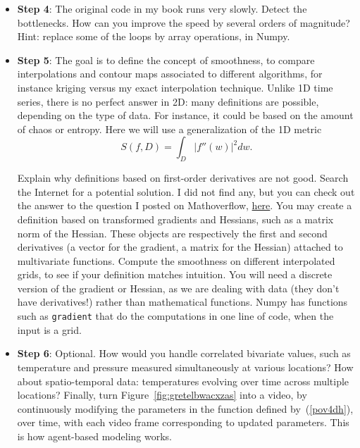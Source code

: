 \documentclass[oneside,10pt]{book}
\begin{document}
\begin{itemize}
\item[] {\bf Step 4}:  The original code in my book runs very slowly. Detect the bottlenecks. How can you improve the speed by several orders of magnitude? Hint: replace some of the loops by array operations, in Numpy.\vspace{1ex}

\item[] {\bf Step 5}:  The goal is to define the concept of smoothness, to compare interpolations and contour maps associated to different algorithms, for instance kriging versus my exact interpolation technique. Unlike 1D time series, there is no perfect answer in 2D: many definitions are possible, depending on the type of data. For instance, it could be based on the amount of chaos or entropy. Here we will use  a generalization of the 
1D metric
$$S(f, D) =  \int_D |f''(w)|^2 dw .$$

Explain why definitions based on first-order derivatives are not good. Search the Internet for a potential solution. I did not find any, but you can check out the answer to the question I posted on Mathoverflow, 
 \href{https://mathoverflow.net/questions/450606/what-are-the-best-definitions-for-smoothness-of-a-2d-curve-real-valued-function}{here}. You may create a definition based on transformed
gradients and \textcolor{index}{Hessians}, such as a matrix norm of the Hessian. These objects are respectively the first and second derivatives (a vector for the gradient, a matrix for the Hessian) 
attached to multivariate functions. Compute the smoothness on different interpolated grids, to see if 
 your definition matches intuition. You will need a discrete version of the gradient or Hessian, as we are dealing with data (they don't have derivatives!) rather than mathematical functions. Numpy has functions  such as \texttt{gradient} that do the computations in one line of code, when the input is a grid.
\vspace{1ex}

\item[] {\bf Step 6}: Optional. How would you handle correlated bivariate values, such as temperature and pressure measured simultaneously at various locations? How about spatio-temporal data: temperatures evolving over time across multiple locations? Finally, turn Figure~\ref{fig:gretelbwacxzas} into a video, by continuously modifying 
the parameters in the function defined by~(\ref{pov4dh}), over time, with each video frame corresponding to updated parameters.  This is how \textcolor{index}{agent-based modeling} works.
\end{itemize}
\end{document}
